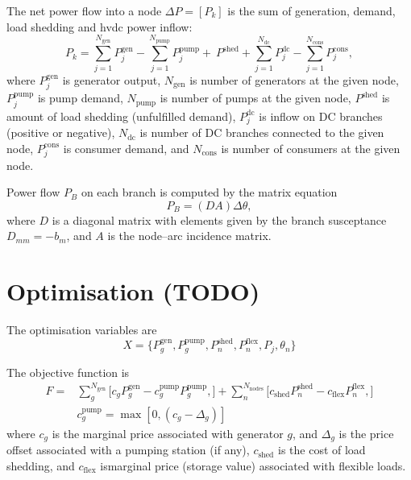 \documentclass{article}
\begin{document}
The net power flow into a node $\Delta P = [P_k]$ is the sum of generation, demand, load shedding and hvdc power inflow:
\begin{equation}
	P_k  = \sum_{j=1}^{N_\text{gen}} P_j^\text{gen}
			- \sum_{j=1}^{N_\text{pump}} P_j^\text{pump}
			+\ P^\text{shed}
			+\sum_{j=1}^{N_\text{dc}} P_j^\text{dc}
			-\sum_{j=1}^{N_\text{cons}} P_j^\text{cons},
\end{equation}
where
$P_j^\text{gen}$ is generator output,
$N_\text{gen}$ is number of generators at the given node,
$P_j^\text{pump}$ is pump demand,
$N_\text{pump}$ is number of pumps at the given node,
$P^\text{shed}$ is amount of load shedding (unfulfilled demand),
$P_j^\text{dc}$ is inflow on DC branches (positive or negative),
$N_\text{dc}$ is number of DC branches connected to the given node,
$P_j^\text{cons}$ is consumer demand,
and $N_\text{cons}$ is number of consumers at the given node.

Power flow $P_B$ on each branch is computed by the matrix equation
\begin{equation}
	P_B = (D A) \Delta\theta,
\end{equation}
where $D$ is a diagonal matrix with elements given by the branch susceptance $D_{mm} =-b_m$, and
$A$ is the node--arc incidence matrix.




\section{Optimisation (TODO)}
The optimisation variables are
\begin{equation}
	X = \{P_g^\text{gen}, P_g^\text{pump}, P_n^\text{shed},P_n^\text{flex},P_j, \theta_n \}
\end{equation}


The objective function is
\begin{align}
	F = & \sum_g^{N_\text{gen}} \bigl[
		c_g P^\text{gen}_g 
		- c_g^\text{pump} P^\text{pump}_g,
		\Bigr]
		+ \sum_n^{N_\text{nodes}} \bigl[
			c_\text{shed} P_n^\text{shed} 
			- c_\text{flex} P_n^\text{flex},		
		\Bigr]
		\\
		\nonumber 
		& c_g^\text{pump} = \max[0,(c_g-\Delta_g)]
\end{align}
where $c_g$ is the marginal price associated with generator $g$, and $\Delta_g$ is the price offset associated with a pumping station (if any),
 $c_\text{shed}$ is the cost of load shedding, and
  $c_\text{flex}$ ismarginal price (storage value) associated with flexible loads.
  
\end{document}

